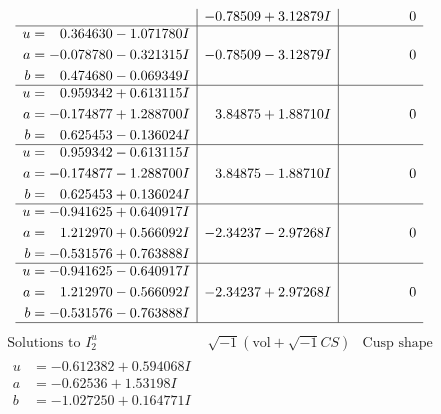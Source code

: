 \documentclass[1p]{elsarticle_modified}
\theoremstyle{definition}
\newcommand{\I}{\sqrt{-1}}
\begin{document}
$$\begin{array}{c|c|c}
 & -0.78509 + 3.12879 I & \phantom{-0.000000 } 0 \\ \hline\begin{aligned}
u &= \phantom{-}0.364630 - 1.071780 I \\
a &= -0.078780 - 0.321315 I \\
b &= \phantom{-}0.474680 - 0.069349 I\end{aligned}
 & -0.78509 - 3.12879 I & \phantom{-0.000000 } 0 \\ \hline\begin{aligned}
u &= \phantom{-}0.959342 + 0.613115 I \\
a &= -0.174877 + 1.288700 I \\
b &= \phantom{-}0.625453 - 0.136024 I\end{aligned}
 & \phantom{-}3.84875 + 1.88710 I & \phantom{-0.000000 } 0 \\ \hline\begin{aligned}
u &= \phantom{-}0.959342 - 0.613115 I \\
a &= -0.174877 - 1.288700 I \\
b &= \phantom{-}0.625453 + 0.136024 I\end{aligned}
 & \phantom{-}3.84875 - 1.88710 I & \phantom{-0.000000 } 0 \\ \hline\begin{aligned}
u &= -0.941625 + 0.640917 I \\
a &= \phantom{-}1.212970 + 0.566092 I \\
b &= -0.531576 + 0.763888 I\end{aligned}
 & -2.34237 - 2.97268 I & \phantom{-0.000000 } 0 \\ \hline\begin{aligned}
u &= -0.941625 - 0.640917 I \\
a &= \phantom{-}1.212970 - 0.566092 I \\
b &= -0.531576 - 0.763888 I\end{aligned}
 & -2.34237 + 2.97268 I & \phantom{-0.000000 } 0\\
 \hline 
 \end{array}$$\newpage$$\begin{array}{c|c|c}  
\text{Solutions to }I^u_{2}& \I (\text{vol} + \sqrt{-1}CS) & \text{Cusp shape}\\
 \hline 
\begin{aligned}
u &= -0.612382 + 0.594068 I \\
a &= -0.62536 + 1.53198 I \\
b &= -1.027250 + 0.164771 I\end{aligned}

\end{array}$$
\end{document}
